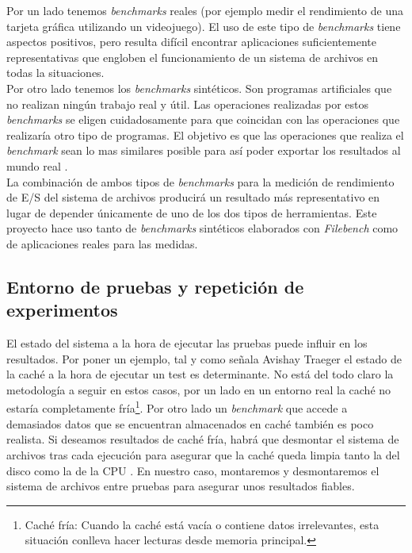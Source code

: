 Por un lado tenemos \textit{benchmarks} reales (por ejemplo medir el rendimiento de una tarjeta gráfica utilizando un videojuego). El uso de este tipo de \textit{benchmarks} tiene aspectos positivos, pero resulta difícil encontrar aplicaciones suficientemente representativas que engloben el funcionamiento de un sistema de archivos en todas la situaciones.\\

Por otro lado tenemos los \textit{benchmarks} sintéticos. Son programas artificiales que no realizan ningún trabajo real y útil. Las operaciones realizadas por estos \textit{benchmarks} se eligen cuidadosamente para que coincidan con las operaciones que realizaría otro tipo de programas. El objetivo es que las operaciones que realiza el \textit{benchmark} sean lo mas similares posible para así poder exportar los resultados al mundo real \cite{lilja_2000}.\\

La combinación de ambos tipos de \textit{benchmarks} para la medición de rendimiento de E/S del sistema de archivos producirá un resultado más representativo en lugar de depender únicamente de uno de los dos tipos de herramientas. Este proyecto hace uso tanto de \textit{benchmarks} sintéticos elaborados con \textit{Filebench} como de aplicaciones reales para las medidas.

\subsection{Entorno de pruebas y repetición de experimentos}\label{numejecs}
El estado del sistema a la hora de ejecutar las pruebas puede influir en los resultados. Por poner un ejemplo, tal y como señala Avishay Traeger \cite{traeger} el estado de la caché a la hora de ejecutar un test es determinante. No está del todo claro la metodología a seguir en estos casos, por un lado en un entorno real la caché no estaría completamente fría\footnote{Caché fría: Cuando la caché está vacía o contiene datos irrelevantes, esta situación conlleva hacer lecturas desde memoria principal.}. Por otro lado un \textit{benchmark} que accede a demasiados datos que se encuentran almacenados en caché también es poco realista. Si deseamos resultados de caché fría, habrá que desmontar el sistema de archivos tras cada ejecución para asegurar que la caché queda limpia tanto la del disco como la de la CPU \cite{traeger}. En nuestro caso, montaremos y desmontaremos el sistema de archivos entre pruebas para asegurar unos resultados fiables.\\

